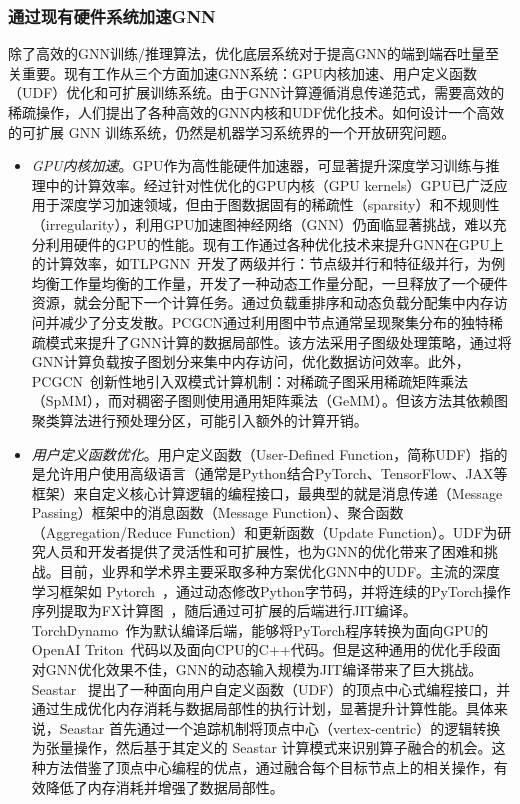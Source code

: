 \subsubsection{通过现有硬件系统加速GNN}
除了高效的GNN训练/推理算法，优化底层系统对于提高GNN的端到端吞吐量至关重要。现有工作从三个方面加速GNN系统：GPU内核加速、用户定义函数（UDF）优化和可扩展训练系统。由于GNN计算遵循消息传递范式，需要高效的稀疏操作，人们提出了各种高效的GNN内核和UDF优化技术。如何设计一个高效的可扩展 GNN 训练系统，仍然是机器学习系统界的一个开放研究问题。
\begin{itemize}
    \item \textit{GPU内核加速}。GPU作为高性能硬件加速器，可显著提升深度学习训练与推理中的计算效率。经过针对性优化的GPU内核（GPU kernels）GPU已广泛应用于深度学习加速领域，但由于图数据固有的稀疏性（sparsity）和不规则性（irregularity），利用GPU加速图神经网络（GNN）仍面临显著挑战，难以充分利用硬件的GPU的性能。现有工作通过各种优化技术来提升GNN在GPU上的计算效率，如TLPGNN~\cite{fu2022tlpgnn}开发了两级并行：节点级并行和特征级并行，为例均衡工作量均衡的工作量，开发了一种动态工作量分配，一旦释放了一个硬件资源，就会分配下一个计算任务。通过负载重排序和动态负载分配集中内存访问并减少了分支发散。PCGCN通过利用图中节点通常呈现聚集分布的独特稀疏模式来提升了GNN计算的数据局部性。该方法采用子图级处理策略，通过将GNN计算负载按子图划分来集中内存访问，优化数据访问效率。此外，PCGCN~\cite{tian2020pcgcn}创新性地引入双模式计算机制：对稀疏子图采用稀疏矩阵乘法（SpMM），而对稠密子图则使用通用矩阵乘法（GeMM）。但该方法其依赖图聚类算法进行预处理分区，可能引入额外的计算开销。
    \item \textit{用户定义函数优化}。用户定义函数（User-Defined Function，简称UDF）指的是允许用户使用高级语言（通常是Python结合PyTorch、TensorFlow、JAX等框架）来自定义核心计算逻辑的编程接口，最典型的就是消息传递（Message Passing）框架中的消息函数（Message Function）、聚合函数（Aggregation/Reduce Function）和更新函数（Update Function）。UDF为研究人员和开发者提供了灵活性和可扩展性，也为GNN的优化带来了困难和挑战。目前，业界和学术界主要采取多种方案优化GNN中的UDF。主流的深度学习框架如 Pytorch~\cite{torchCompile}，通过动态修改Python字节码，并将连续的PyTorch操作序列提取为FX计算图~\cite{reed2022torchfxpracticalprogramcapture}，随后通过可扩展的后端进行JIT编译。TorchDynamo~\cite{TorchDynamo}作为默认编译后端，能够将PyTorch程序转换为面向GPU的OpenAI Triton~\cite{wang2025mltritonmultilevelcompilationlanguage}代码以及面向CPU的C++代码。但是这种通用的优化手段面对GNN优化效果不佳，GNN的动态输入规模为JIT编译带来了巨大挑战。Seastar~\cite{wu2021seastar} 提出了一种面向用户自定义函数（UDF）的顶点中心式编程接口，并通过生成优化内存消耗与数据局部性的执行计划，显著提升计算性能。具体来说，Seastar 首先通过一个追踪机制将顶点中心（vertex-centric）的逻辑转换为张量操作，然后基于其定义的 Seastar 计算模式来识别算子融合的机会。这种方法借鉴了顶点中心编程的优点，通过融合每个目标节点上的相关操作，有效降低了内存消耗并增强了数据局部性。
\end{itemize}
